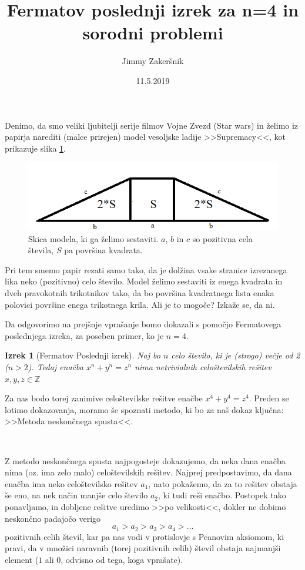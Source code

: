 \documentclass[a4paper, 10pt]{article}
\title{Fermatov poslednji izrek za n=4 in sorodni problemi}
\date{11.5.2019}
\author{Jimmy Zakeršnik}
\newtheorem{izr}{Izrek}
\newcommand{\mth}[1]{\ensuremath{\mathbb{#1}}}
\newcommand{\Z}{\mth{Z}}
\begin{document}
\maketitle
\thispagestyle{empty}
\newpage

Denimo, da smo veliki ljubitelji serije filmov Vojne Zvezd (Star wars) in želimo iz papirja narediti (malce prirejen) model vesoljske ladije >>Supremacy<<, kot prikazuje slika \ref{fig:mot}.

\begin{figure}[h]
\centering
\includegraphics[scale=0.75]{Motivacijska_slika}
\caption{Skica modela, ki ga želimo sestaviti. $a$, $b$ in $c$ so pozitivna cela števila, $S$ pa površina kvadrata.}
\label{fig:mot}
\end{figure}

 Pri tem smemo papir rezati samo tako, da je dolžina vsake stranice izrezanega lika neko (pozitivno) celo število. Model želimo sestaviti iz enega kvadrata in dveh pravokotnih trikotnikov tako, da bo površina  kvadratnega lista enaka polovici površine enega trikotnega krila. Ali je to mogoče? Izkaže se, da ni.

Da odgovorimo na prejšnje vprašanje bomo dokazali s pomočjo Fermatovega poslednjega izreka, za poseben primer, ko je $n = 4$. 

\begin{izr}[Fermatov Poslednji izrek]
Naj bo $n$ celo število, ki je (strogo) večje od 2 ($n > 2$). Tedaj enačba $ x^n + y^n = z^n $ nima netrivialnih celoštevilskih rešitev $x, y, z \in \Z$
\end{izr}

Za nas bodo torej zanimive celoštevilske rešitve enačbe $x^4 + y^4 = z^4$. Preden se lotimo dokazovanja, moramo še spoznati metodo, ki bo za naš dokaz ključna: >>Metoda neskončnega spusta<<.

$ $

Z metodo neskončnega spusta najpogosteje dokazujemo, da neka dana enačba nima (oz. ima zelo malo) celoštevilskih rešitev. Najprej predpostavimo, da dana enačba ima neko celoštevilsko rešitev $a_1$, nato pokažemo, da za to rešitev obstaja še eno, na nek način manjše  celo število $a_2$, ki tudi reši enačbo. Postopek tako ponavljamo, in dobljene rešitve uredimo >>po velikosti<<, dokler ne dobimo neskončno padajočo verigo 
\[
a_1 > a_2 > a_3 > a_4 > \ldots
\]
pozitivnih celih števil, kar pa nas vodi v protislovje s Peanovim aksiomom, ki pravi, da v množici naravnih (torej pozitivnih celih) števil obstaja najmanjši element ($1$ ali $0$, odvisno od tega, koga vprašate).
\end{document}

